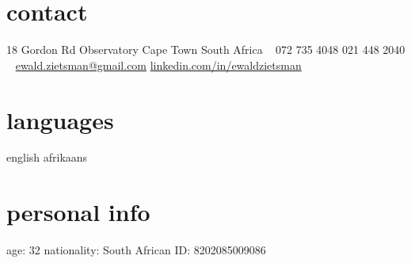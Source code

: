 \documentclass[]{friggeri-cv} %
\begin{document}


\begin{aside} %
\section{contact}
18 Gordon Rd
Observatory
Cape Town
South Africa
~
072 735 4048
021 448 2040
~
\href{mailto:ewald.zietsman@gmail.com}{ewald.zietsman@gmail.com}
\href{http://za.linkedin.com/in/ewaldzietsman/}{linkedin.com/in/ewaldzietsman}
\section{languages}
english 
afrikaans
\section{personal info}
age: 32
nationality: South African
ID: 8202085009086
\end{aside}
\end{document}
